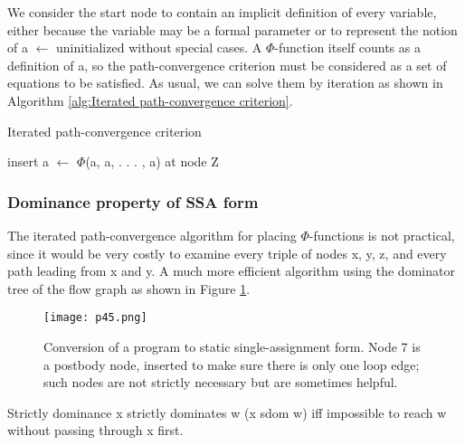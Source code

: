 

We consider the start node to contain an implicit definition of every variable, either because the variable may be a formal parameter or to represent the notion of a
$\leftarrow$ uninitialized without special cases. A $\Phi$-function itself counts as a definition of a, so the path-convergence criterion must be considered as a set of equations to be satisfied. 
As usual, we can solve them by iteration as shown in Algorithm \ref{alg:Iterated path-convergence criterion}.


\begin{algorithm}
	\caption{Iterated path-convergence criterion}\label{alg:Iterated path-convergence criterion}
	\begin{algorithmic}

		\State  insert a $\leftarrow$ $\Phi$(a, a, . . . , a) at node Z
		\EndWhile
	\end{algorithmic}
\end{algorithm}

\subsubsection{Dominance property of SSA form}

The iterated path-convergence algorithm for placing $\Phi$-functions is not practical, since it would be very costly to examine every triple of nodes x, y, z, and every path leading from x and y.  A much more efficient algorithm using the dominator tree of the flow graph as shown in Figure \ref{fig:p45}.


\begin{figure}[H]
	\centering
	\texttt{[image: p45.png]}
	\caption{ Conversion of a program to static single-assignment form. Node 7 is a postbody node, inserted to make sure there is only one loop edge; such nodes are not strictly necessary but are sometimes helpful.}
	\label{fig:p45}

\end{figure}


\begin{definition}{Strictly dominance}
	x strictly dominates w (x sdom w) iff impossible to reach w without passing through x first.
\end{definition}

